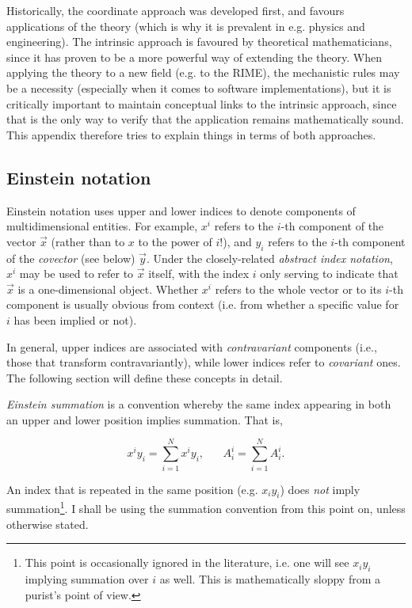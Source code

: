 \documentclass[]{aa}
\begin{document}
Historically, the coordinate approach was developed first, and favours applications of the theory (which is why it is prevalent in e.g. physics and engineering). The intrinsic approach is favoured by theoretical mathematicians, since it has proven to be a more powerful way of extending the theory. When applying the theory to a new field (e.g. to the RIME), the mechanistic rules may be a necessity (especially when it comes to software implementations), but it is critically important to maintain conceptual links to the intrinsic approach, since that is the only way to verify that the application remains mathematically sound. This appendix therefore tries to explain things in terms of both approaches.

\subsection{Einstein notation}
\label{sec:einstein-notation}

Einstein notation uses upper and lower indices to denote components of multidimensional entities. For example, $x^i$ refers to the $i$-th component  of the vector $\vec x$ (rather than to $x$ to the power of $i$!), and $y_i$ refers to the $i$-th component of the \emph{covector} (see below) $\vec y$. Under the closely-related \emph{abstract index notation}, $x^i$ may be used to refer to $\vec x$ itself, with the index $i$ only serving to indicate that $\vec x$ is a one-dimensional object. Whether $x^i$ refers to the whole vector or to its $i$-th component is usually obvious from context (i.e. from whether a specific value for $i$ has been implied or not).

In general, upper indices are associated with \emph{contravariant} components (i.e., those that transform contravariantly), while lower indices refer  to \emph{covariant} ones. The following section will define these concepts in detail.

{\em Einstein summation} is a convention whereby the same index appearing in both an upper and lower position implies summation. That is,

\[
  x^i y_i = \sum_{i=1}^{N} x^i y_i, \;\;\;\;\;\; A^i_i = \sum_{i=1}^{N} A^i_i.
\]

An index that is repeated in the same position (e.g. $x_iy_i$) does \emph{not} imply summation\footnote{This point is occasionally ignored in the literature, i.e. one will see $x_i y_i$ implying summation over $i$ as well. This is mathematically sloppy from a purist's point of view.}. I shall be using the summation convention from this point on, unless otherwise stated.
\end{document}
